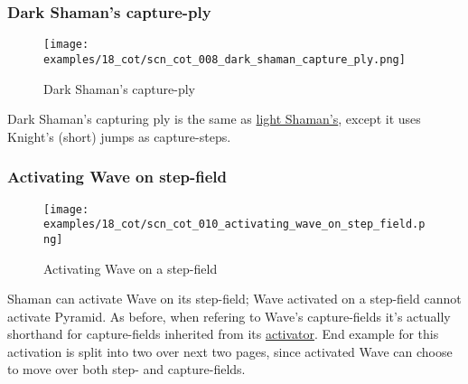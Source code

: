 \vspace*{-1.4\baselineskip}
\subsubsection*{Dark Shaman's capture-ply}
\label{sec:Conquest of Tlalocan/Shaman/Movement/Dark Shaman's capture-ply}

\vspace*{-1.4\baselineskip}
\noindent
\begin{figure}[!h]
\texttt{[image: examples/18\_cot/scn\_cot\_008\_dark\_shaman\_capture\_ply.png]}
\vspace*{-1.4\baselineskip}
\caption{Dark Shaman's capture-ply}
\label{fig:scn_cot_008_dark_shaman_capture_ply}
\end{figure}

\vspace*{-0.4\baselineskip}
Dark Shaman's capturing ply is the same as
\hyperref[fig:scn_cot_004_light_shaman_capture_ply]{light Shaman's}, except it uses
Knight's (short) jumps as capture-steps.

\clearpage %

\subsubsection*{Activating Wave on step-field}
\label{sec:Conquest of Tlalocan/Shaman/Movement/Activating Wave on step-field}

\vspace*{-1.4\baselineskip}
\noindent
\begin{figure}[!h]
\texttt{[image: examples/18\_cot/scn\_cot\_010\_activating\_wave\_on\_step\_field.png]}
\vspace*{-1.4\baselineskip}
\caption{Activating Wave on a step-field}
\label{fig:scn_cot_010_activating_wave_on_step_field}
\end{figure}

\vspace*{-0.5\baselineskip}
Shaman can activate Wave on its step-field; Wave activated on a step-field cannot
activate Pyramid.\newline
\indent
As before, when refering to Wave's capture-fields it's actually shorthand for
capture-fields inherited from its \hyperref[sec:Terms/Activator]{activator}.\newline
\indent
End example for this activation is split into two over next two pages, since
activated Wave can choose to move over both step- and capture-fields.

